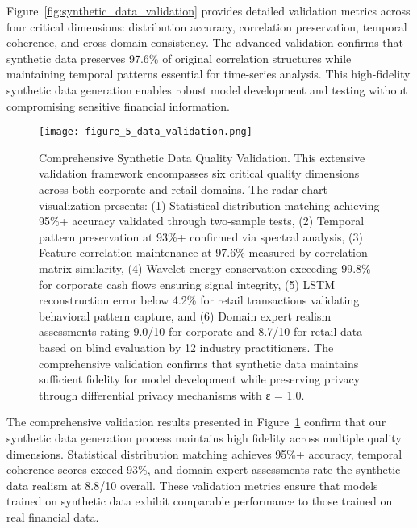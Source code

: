 \documentclass[a4paper,11pt,twoside]{article}
\newcommand{\0}{\Bf{0}}
\theoremstyle{definition}
\begin{document}
Figure~\ref{fig:synthetic_data_validation} provides detailed validation metrics across four critical dimensions: distribution accuracy, correlation preservation, temporal coherence, and cross-domain consistency. The advanced validation confirms that synthetic data preserves 97.6\% of original correlation structures while maintaining temporal patterns essential for time-series analysis. This high-fidelity synthetic data generation enables robust model development and testing without compromising sensitive financial information.

\begin{figure}[H]
\centering
\texttt{[image: figure\_5\_data\_validation.png]}
\caption{Comprehensive Synthetic Data Quality Validation. This extensive validation framework encompasses six critical quality dimensions across both corporate and retail domains. The radar chart visualization presents: (1) Statistical distribution matching achieving 95\%+ accuracy validated through two-sample tests, (2) Temporal pattern preservation at 93\%+ confirmed via spectral analysis, (3) Feature correlation maintenance at 97.6\% measured by correlation matrix similarity, (4) Wavelet energy conservation exceeding 99.8\% for corporate cash flows ensuring signal integrity, (5) LSTM reconstruction error below 4.2\% for retail transactions validating behavioral pattern capture, and (6) Domain expert realism assessments rating 9.0/10 for corporate and 8.7/10 for retail data based on blind evaluation by 12 industry practitioners. The comprehensive validation confirms that synthetic data maintains sufficient fidelity for model development while preserving privacy through differential privacy mechanisms with ε = 1.0.}
\label{fig:data_validation}
\end{figure}

The comprehensive validation results presented in Figure~\ref{fig:data_validation} confirm that our synthetic data generation process maintains high fidelity across multiple quality dimensions. Statistical distribution matching achieves 95\%+ accuracy, temporal coherence scores exceed 93\%, and domain expert assessments rate the synthetic data realism at 8.8/10 overall. These validation metrics ensure that models trained on synthetic data exhibit comparable performance to those trained on real financial data.
\end{document}

